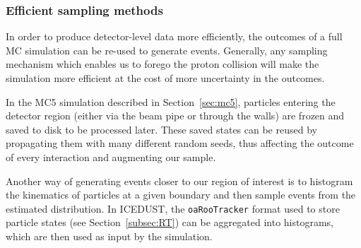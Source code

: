 


\subsubsection{Efficient sampling methods}
In order to produce detector-level data more efficiently, the outcomes of a full
MC simulation can be re-used to generate events. Generally, any sampling
mechanism which enables us to forego the proton collision will make the
simulation more efficient at the cost of more uncertainty in the outcomes.

In the MC5 simulation described in Section~\ref{sec:mc5}, particles
entering the detector region (either via the beam pipe or through the walls) are
frozen and saved to disk to be processed later. These saved states can be reused
by propagating them with many different random seeds, thus affecting the outcome
of every interaction and augmenting our sample.

Another way of generating events closer to our region of interest is to
histogram the kinematics of particles at a given boundary and then sample events
from the estimated distribution. In ICEDUST, the \texttt{oaRooTracker} format
used to store particle states (see Section~\ref{subsec:RT}) can be aggregated
into histograms, which are then used as input by the simulation.



